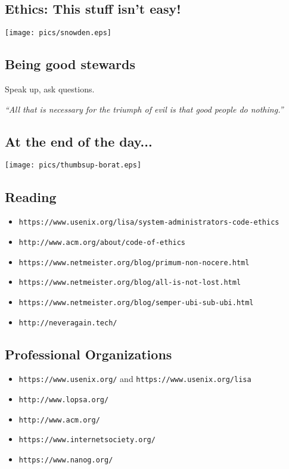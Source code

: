 \documentclass[xga]{xdvislides}
\begin{document}
\subsection{Ethics: This stuff isn't easy!}
\begin{center}
       \texttt{[image: pics/snowden.eps]}
\end{center}

\subsection{Being good stewards}
\Huge
\vspace*{\fill}
\begin{center}

Speak up, ask questions. \\

\vspace{.5in}

{\em ``All that is necessary for the triumph of evil is
that good people do nothing.''}

\end{center}
\vspace*{\fill}
\Normalsize


\subsection{At the end of the day...}
\begin{center}
	\texttt{[image: pics/thumbsup-borat.eps]}
\end{center}

\subsection{Reading}
\begin{itemize}
	\item \verb+https://www.usenix.org/lisa/system-administrators-code-ethics+
	\item \verb+http://www.acm.org/about/code-of-ethics+
	\item \verb+https://www.netmeister.org/blog/primum-non-nocere.html+
	\item \verb+https://www.netmeister.org/blog/all-is-not-lost.html+
	\item \verb+https://www.netmeister.org/blog/semper-ubi-sub-ubi.html+
	\item \verb+http://neveragain.tech/+
\end{itemize}

\subsection{Professional Organizations}
\begin{itemize}
	\item \verb+https://www.usenix.org/+ and \verb+https://www.usenix.org/lisa+
	\item \verb+http://www.lopsa.org/+
	\item \verb+http://www.acm.org/+
	\item \verb+https://www.internetsociety.org/+
	\item \verb+https://www.nanog.org/+
\end{itemize}
\end{document}
